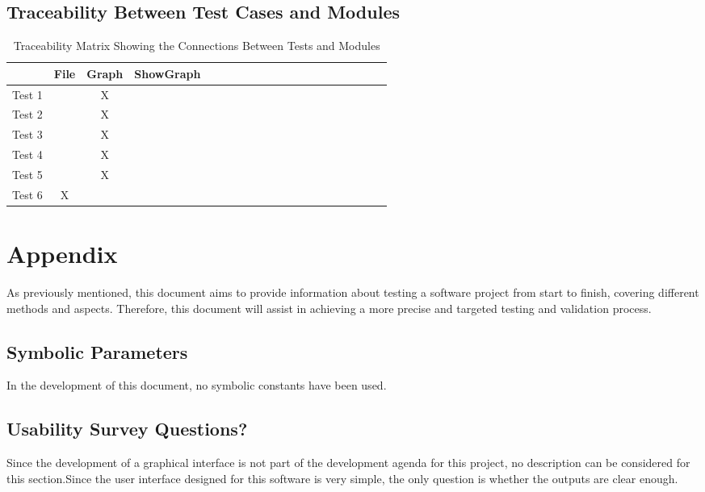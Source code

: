 \documentclass[12pt, titlepage]{article}
\begin{document}
\subsection{Traceability Between Test Cases and Modules}
\begin{table}[h!]
\centering
\begin{tabular}{|c|c|c|c|c|c|c|c|c|c|c|c|c|c|c|c|c|c|c|c|}
\hline
	&File &Graph &ShowGraph\\
\hline
Test 1     & & X&  \\ \hline
Test 2     & & X&  \\ \hline
Test 3    & & X&  \\ \hline
Test 4     & & X&  \\ \hline
Test 5     & & X&  \\ \hline
Test 6     &X & &  \\ \hline

\end{tabular}
\caption{Traceability Matrix Showing the Connections Between Tests and Modules}
\label{Table:A_trace}
\end{table}

				


\newpage

\section{Appendix}

As previously mentioned, this document aims to provide information about testing a software project from start to finish, covering different methods and aspects. Therefore, this document will assist in achieving a more precise and targeted testing and validation process.

\subsection{Symbolic Parameters}

In the development of this document, no symbolic constants have been used.
\subsection{Usability Survey Questions?}

Since the development of a graphical interface is not part of the development agenda for this project, no description can be considered for this section.Since the user interface designed for this software is very simple, the only question is whether the outputs are clear enough.

\newpage{}
\end{document}
